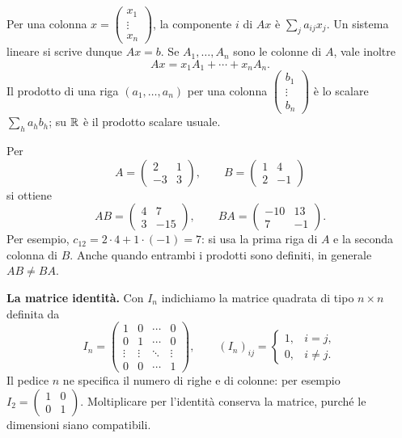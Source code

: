 Per una colonna $x=\left(\begin{smallmatrix}x_1\\\vdots\\x_n\end{smallmatrix}\right)$, la componente $i$ di $Ax$ è $\sum_j a_{ij}x_j$. Un sistema lineare si scrive dunque $Ax=b$. Se $A_1,\ldots,A_n$ sono le colonne di $A$, vale inoltre
\[
 Ax=x_1A_1+\cdots+x_nA_n.
\]
Il prodotto di una riga $(a_1,\ldots,a_n)$ per una colonna $\left(\begin{smallmatrix}b_1\\\vdots\\b_n\end{smallmatrix}\right)$ è lo scalare $\sum_h a_hb_h$; su $\mathbb{R}$ è il prodotto scalare usuale.

\begin{esempio}
Per
\[
 A=\begin{pmatrix}2&1\\-3&3\end{pmatrix},\qquad
 B=\begin{pmatrix}1&4\\2&-1\end{pmatrix}
\]
si ottiene
\[
 AB=\begin{pmatrix}4&7\\3&-15\end{pmatrix},\qquad
 BA=\begin{pmatrix}-10&13\\7&-1\end{pmatrix}.
\]
Per esempio, $c_{12}=2\cdot4+1\cdot(-1)=7$: si usa la prima riga di $A$ e la seconda colonna di $B$. Anche quando entrambi i prodotti sono definiti, in generale $AB\ne BA$.
\end{esempio}

\textbf{La matrice identità.} Con $I_n$ indichiamo la matrice quadrata di tipo $n\times n$ definita da
\[
 I_n=\begin{pmatrix}
 1&0&\cdots&0\\0&1&\cdots&0\\
 \vdots&\vdots&\ddots&\vdots\\0&0&\cdots&1
 \end{pmatrix},\qquad
 (I_n)_{ij}=\begin{cases}1,&i=j,\\0,&i\ne j.\end{cases}
\]
Il pedice $n$ ne specifica il numero di righe e di colonne: per esempio $I_2=\left(\begin{smallmatrix}1&0\\0&1\end{smallmatrix}\right)$. Moltiplicare per l'identità conserva la matrice, purché le dimensioni siano compatibili.

